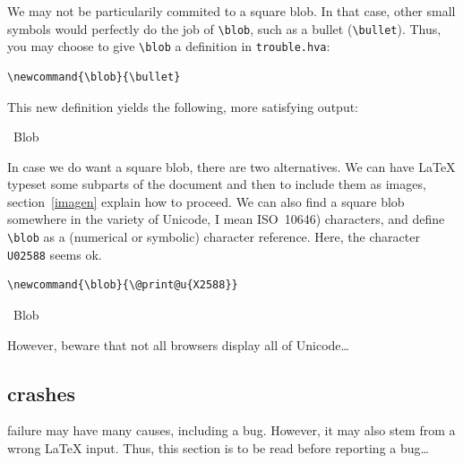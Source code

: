 We may not be particularily commited to a square blob.
In that case, other small symbols would perfectly do the job
of \verb+\blob+, such as a bullet (\verb+\bullet+).
Thus, you may choose to give \verb+\blob+ a definition in
\verb+trouble.hva+:
\begin{verbatim}
\newcommand{\blob}{\bullet}
\end{verbatim}
This new definition yields the following, more satisfying output:
\begin{htmlout}\newcommand{\blob}{\bullet}%
\begin{htmlonly}%
\blob\ Blob \blob
\end{htmlonly}
\begin{latexonly}\vspace*{.5ex}
%
\end{latexonly}%
\end{htmlout}

\label{square:blob}
%
In case we do want a square blob, there are two alternatives.
We can have \LaTeX{} typeset some subparts of
the document and then to include them as images, section~\ref{imagen}
explain how to proceed.
We can also find a square blob somewhere in the variety of Unicode, I
mean ISO~10646) characters,
and define \verb+\blob+ as a (numerical or symbolic)
character reference. Here, the character \texttt{U02588}
seems ok.
\begin{verbatim}
\newcommand{\blob}{\@print@u{X2588}}
\end{verbatim}
\begin{htmlout}%
\begin{htmlonly}\newcommand{\blob}{}%
\blob\ Blob \blob
\end{htmlonly}
\begin{latexonly}\vspace*{.5ex}
%
\end{latexonly}%
\end{htmlout}
However, beware that not all browsers display all of Unicode\ldots


\subsection{\hevea{} crashes}

\hevea{} failure may have many causes, including a bug.
However, it may also stem from a wrong \LaTeX{} input.
Thus, this section is to be read before reporting a bug\ldots

